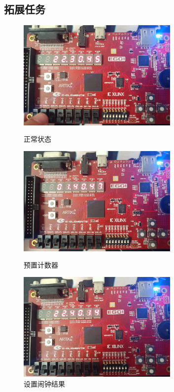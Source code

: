 \documentclass{article}
\begin{document}
\subsection*{拓展任务}
\begin{figure}[H]
    \begin{minipage}[t]{0.3\linewidth}
        \centering
        \includegraphics[width=0.7\textwidth]{image/2024-06-26-09-04-34.png}
        \caption{正常状态}
        \label{image_alarm_verify_1_1}
    \end{minipage}
    \begin{minipage}[t]{0.3\linewidth}
        \centering
        \includegraphics[width=0.7\textwidth]{image/2024-06-26-09-05-12.png}
        \caption{预置计数器}
        \label{image_alarm_verify_1_2}
    \end{minipage}
    \begin{minipage}[t]{0.3\linewidth}
        \centering
        \includegraphics[width=0.7\textwidth]{image/2024-06-26-09-05-49.png}
        \caption{设置闹钟结果}
        \label{image_alarm_verify_1_3}
    \end{minipage}
\end{figure}
\end{document}
